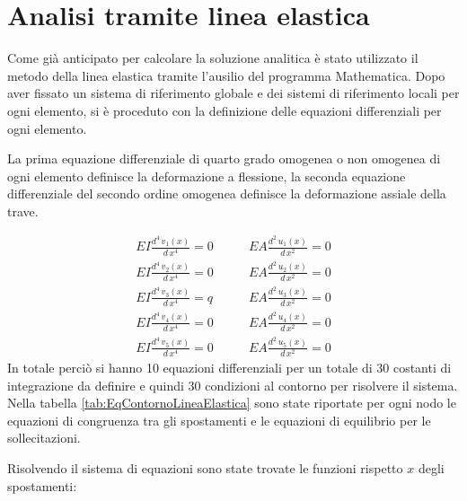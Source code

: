 \section{Analisi tramite linea elastica}
Come già anticipato per calcolare la soluzione analitica è stato utilizzato il metodo della linea elastica tramite l'ausilio del programma Mathematica.
Dopo aver fissato un sistema di riferimento globale e dei sistemi di riferimento locali per ogni elemento, si è proceduto con la definizione delle equazioni differenziali per ogni elemento. 

La prima equazione differenziale di quarto grado omogenea o non omogenea di ogni elemento definisce la deformazione a flessione, la seconda equazione differenziale del secondo ordine omogenea definisce la deformazione assiale della trave.

{\footnotesize{
\begin{align*}
    EI\frac{d^4\,v_1(x)}{d\,x^4} = 0 &\qquad
    EA\frac{d^2\,u_1(x)}{d\,x^2} = 0 \\
    EI\frac{d^4\,v_2(x)}{d\,x^4} = 0 &\qquad
    EA\frac{d^2\,u_2(x)}{d\,x^2} = 0 \\
    EI\frac{d^4\,v_3(x)}{d\,x^4} = q &\qquad
    EA\frac{d^2\,u_3(x)}{d\,x^2} = 0 \\
    EI\frac{d^4\,v_4(x)}{d\,x^4} = 0 &\qquad
    EA\frac{d^2\,u_4(x)}{d\,x^2} = 0 \\
    EI\frac{d^4\,v_5(x)}{d\,x^4} = 0 &\qquad
    EA\frac{d^2\,u_5(x)}{d\,x^2} = 0 
\end{align*}}}
In totale perciò si hanno 10 equazioni differenziali per un totale di 30 costanti di integrazione da definire e quindi 30 condizioni al contorno per risolvere il sistema.
Nella tabella \ref{tab:EqContornoLineaElastica} sono state riportate per ogni nodo le equazioni di congruenza tra gli spostamenti e le equazioni di equilibrio per le sollecitazioni.


Risolvendo il sistema di equazioni sono state trovate le funzioni rispetto $x$ degli spostamenti:

